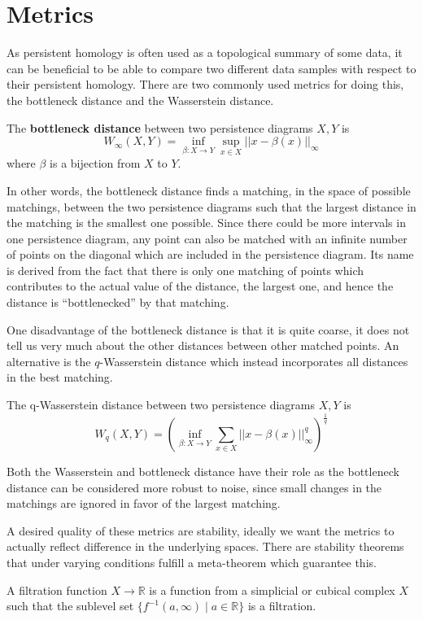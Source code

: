   \section{Metrics}
  As persistent homology is often used as a topological summary of some data, it can be beneficial to be able to compare two different data samples with respect to their persistent homology. There are two commonly used metrics for doing this, the bottleneck distance and the Wasserstein distance.
  \begin{definition}
    The \textbf{bottleneck distance} between two persistence diagrams $X,Y$ is
    \[W_{\infty}(X,Y) = \inf_{\beta: X \to Y} \sup_{x \in X} ||x-\beta(x)||_{\infty}\]
    where $\beta$ is a bijection from $X$ to $Y$.
  \end{definition}
In other words, the bottleneck distance finds a matching, in the space of possible matchings, between the two persistence diagrams such that the largest distance in the matching is the smallest one possible. Since there could be more intervals in one persistence diagram, any point can also be matched with an infinite number of points on the diagonal which are included in the persistence diagram. Its name is derived from the fact that there is only one matching of points which contributes to the actual value of the distance, the largest one, and hence the distance is ``bottlenecked'' by that matching.

One disadvantage of the bottleneck distance is that it is quite coarse, it does not tell us very much about the other distances between other matched points. An alternative is the $q$-Wasserstein distance which instead incorporates all distances in the best matching.
  \begin{definition}
    The q-Wasserstein distance between two persistence diagrams $X,Y$ is
    \[W_{q}(X,Y) = (\inf_{\beta: X \to Y} \sum_{x \in X}  ||x-\beta(x)||_{\infty}^{q})^{\frac{1}{q}}\]
  \end{definition}
  Both the Wasserstein and bottleneck distance have their role as the bottleneck distance can be considered more robust to noise, since small changes in the matchings are ignored in favor of the largest matching.

  A desired quality of these metrics are stability, ideally we want the metrics to actually reflect difference in the underlying spaces. There are stability theorems that under varying conditions fulfill a meta-theorem which guarantee this.

  \begin{definition}
    A filtration function $X \to \mathbb{R}$ is a function from a simplicial or cubical complex $X$ such that the sublevel set $\{ f^{-1}(a,\infty) \mid a \in \mathbb{R} \}$ is a filtration.
  \end{definition}

